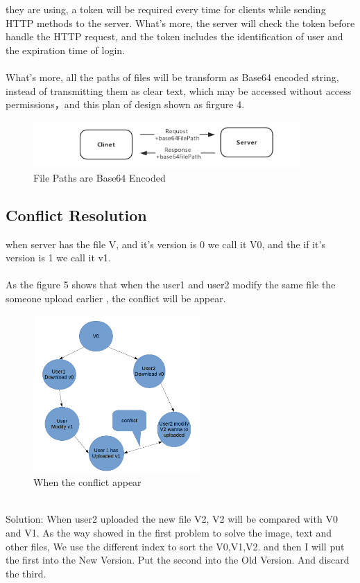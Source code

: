 \documentclass[12pt,a4]{article}
\begin{document}
they are using, a token will be required every time for clients while sending HTTP methods to the server. What’s more, the server will check the token before handle the HTTP request, and the token includes the identification of user and the expiration time of login.\\\\
What’s more, all the paths of files will be transform as Base64 encoded string, instead of transmitting them as clear text, which may be accessed without access permissions，and this plan of design shown as firgure 4.
\begin{figure}[h]%
		\centering  %
		\includegraphics[width=4in]{figure/4}  	%
		\caption{File Paths are Base64 Encoded }   %
		\end{figure}
\subsection{Conflict Resolution}\label{3.4}
when server has the file V, and it’s version is 0 we call it V0, and the if it’s version is 1 we call it v1.\\
\\
As the figure 5 shows that when the user1 and user2 modify the same file the someone upload earlier , the conflict will be appear.
\begin{figure}[h]%
		\centering  %
		\includegraphics[width=2.5in]{figure/conflict}  	%
		\caption{When the conflict appear}   %
		\end{figure}
		\\
Solution:
When user2 uploaded the new file V2, V2 will be compared with V0 and V1. As the way showed in the first problem to solve the image, text and other files, We use the different index to sort the V0,V1,V2. and then I will put the first into the New Version. Put the second into the Old Version. And discard the third.
\end{document}
